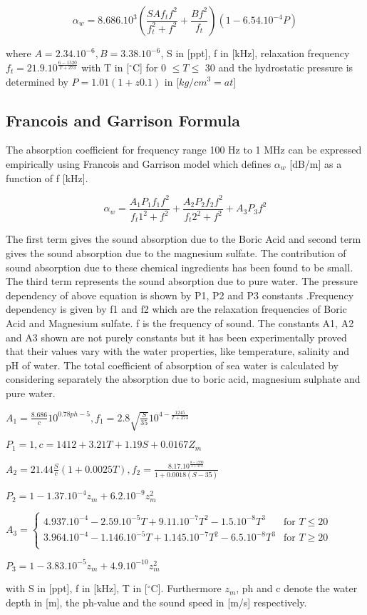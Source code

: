 \[ \alpha_w  = 8.686.10^3 (\frac{S A f_t  f^2}{f_t ^2 + f^2} + \frac{B f^2}{f_t})(1 - 6.54.10^{-4} P) \] 

\noindent where  \(A = 2.34.10^{-6}, B = 3.38.10^{-6}\), S in [ppt], f in [kHz], relaxation frequency \(f_t = 21.9.10^\frac{6-1520}{T+273}\) with T in [$^{\circ}$C] for 0 $\leq T \leq$ 30 and the hydrostatic pressure is determined by \( P = 1.01 (1 + z 0.1)\) in [$kg/cm^3 = at$]

\subsection{ Francois and Garrison Formula } \label{ Francois and Garrison Formula }

\noindent  The absorption coefficient for frequency range 100 Hz to 1 MHz can be expressed empirically using Francois and Garrison model which defines  $\alpha_w$ [dB/m] as a function of f [kHz].

\[ \alpha_w  = \frac{ A _1 P_1 f_1 f^2}{f_t1^2 + f^2} + \frac{ A _2 P_2 f_2 f^2}{f_t2^2 + f^2}  + A_3 P_3 f^2 \] 

\noindent The first term gives the sound absorption due to the Boric Acid and second term gives the sound absorption due to the magnesium sulfate. The contribution of sound absorption due to these chemical ingredients has been found to be small. The third term represents the sound absorption due to pure water. The pressure dependency of above equation is shown by P1, P2 and P3 constants .Frequency dependency is given by f1 and f2 which are the relaxation frequencies of Boric Acid and Magnesium sulfate. f is the frequency of sound. The constants A1, A2 and A3 shown are not purely constants but it has been experimentally proved that their values vary with the water properties, like temperature, salinity and pH of water. The total coefficient of absorption of sea water is calculated by considering separately the absorption due to boric acid, magnesium sulphate and pure water. 

\noindent \(A_1 = \frac{8.686}{c} 10^{0.78 ph - 5}, f_1 = 2.8 \sqrt{\frac{S}{35}}10^{4 - \frac{1245}{T+273}}\)

\noindent \( P_1 = 1, c = 1412 +3.21 T + 1.19 S + 0.0167 Z_m\)

\noindent \(A_2 = 21.44\frac{S}{c}(1 + 0.0025 T),  f_2 = \frac{8.17.10^{\frac{8-1990}{T+273}}}{1+0.0018(S-35)}\)

\noindent \( P_2 = 1 - 1.37.10^{-4} z_m + 6.2.10^{-9} z_m^2 \)

\noindent \(A_3 =
\begin{cases}
  4.937.10^{-4} - 2.59.10^{-5} T + 9.11.10^{-7} T^2 - 1.5.10^{-8} T^3 & \text{for $T \leq 20$ }\\    
 3.964.10^{-4} - 1.146.10^{-5} T + 1.145.10^{-7} T^2 - 6.5.10^{-8} T^3 & \text{for $T \geq 20$ }\\  
\end{cases}
\)

\noindent \( P_3 = 1 - 3.83.10^{-5} z_m + 4.9.10^{-10} z_m^2 \)

\noindent with S in [ppt], f in [kHz], T in [$^{\circ}$C]. Furthermore $z_m$, ph and c denote the water depth in [m], the ph-value and the sound speed in [m/s] respectively.
